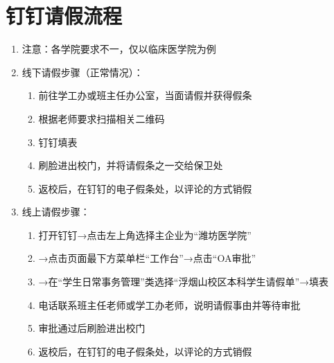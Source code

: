 \section[钉钉请假流程]{钉钉请假流程\footnotemark}
\label{leave_dingtalk}
\begin{enumerate}
    \item 注意：各学院要求不一，仅以临床医学院为例
    \item 线下请假步骤（正常情况）：
          \begin{enumerate}
              \item 前往学工办或班主任办公室，当面请假并获得假条
              \item 根据老师要求扫描相关二维码
              \item 钉钉填表
              \item 刷脸进出校门，并将请假条之一交给保卫处
              \item 返校后，在钉钉的电子假条处，以评论的方式销假
          \end{enumerate}
    \item 线上请假步骤：
          \begin{enumerate}
              \item 打开钉钉→点击左上角选择主企业为“潍坊医学院”
              \item →点击页面最下方菜单栏“工作台”→点击“OA审批”
              \item →在“学生日常事务管理”类选择“浮烟山校区本科学生请假单”→填表
              \item 电话联系班主任老师或学工办老师，说明请假事由并等待审批
              \item 审批通过后刷脸进出校门
              \item 返校后，在钉钉的电子假条处，以评论的方式销假
          \end{enumerate}
\end{enumerate}


